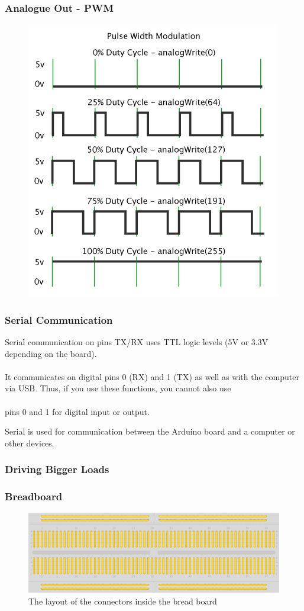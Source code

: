 \begin{frame}
	\frametitle{Analogue Out - PWM}
	\begin{figure}
   		\includegraphics[scale=.4]{assets/pwm} 
	\end{figure}
\end{frame}

\begin{frame}
	\frametitle{Serial Communication}
	Serial communication on pins TX/RX uses TTL logic levels (5V or 3.3V depending on the board). \\~\\
		
	It communicates on digital pins 0 (RX) and 1 (TX) as well as with the computer via USB. Thus, if you use these functions, you cannot also use \\~\\pins 0 and 1 for digital input or output. 
	
	
	Serial is used for communication between the Arduino board and a computer or other devices. 
	
\end{frame}

\begin{frame}
	\frametitle{Driving Bigger Loads}
\end{frame}

\begin{frame}
	\frametitle{Breadboard}
	\begin{figure}
		\includegraphics[scale=.25]{assets/breadboard} 
		\caption{The layout of the connectors inside the bread board}
	\end{figure}
\end{frame}

